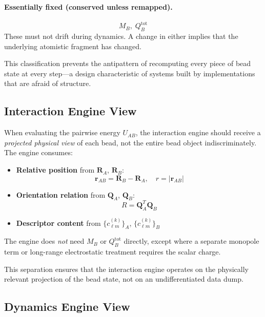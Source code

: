 \documentclass[11pt]{article}
\begin{document}
\paragraph{Essentially fixed (conserved unless remapped).}
\begin{equation}
    M_B,\; Q_B^{\mathrm{tot}}
\end{equation}
These must not drift during dynamics.  A change in either implies that
the underlying atomistic fragment has changed.

This classification prevents the antipattern of recomputing every piece of
bead state at every step---a design characteristic of systems built by
implementations that are afraid of structure.

\subsection{Interaction Engine View}

When evaluating the pairwise energy $U_{AB}$, the interaction engine should
receive a \emph{projected physical view} of each bead, not the entire bead
object indiscriminately.  The engine consumes:
\begin{itemize}
    \item \textbf{Relative position} from $\mathbf{R}_A$, $\mathbf{R}_B$:
          \begin{equation}
              \mathbf{r}_{AB} = \mathbf{R}_B - \mathbf{R}_A, \quad
              r = |\mathbf{r}_{AB}|
          \end{equation}
    \item \textbf{Orientation relation} from $\mathbf{Q}_A$, $\mathbf{Q}_B$:
          \begin{equation}
              R = \mathbf{Q}_A^T \mathbf{Q}_B
          \end{equation}
    \item \textbf{Descriptor content} from $\{c_{\ell m}^{(k)}\}_A$,
          $\{c_{\ell m}^{(k)}\}_B$
\end{itemize}

The engine does \emph{not} need $M_B$ or $Q_B^{\mathrm{tot}}$ directly,
except where a separate monopole term or long-range electrostatic treatment
requires the scalar charge.

This separation ensures that the interaction engine operates on the
physically relevant projection of the bead state, not on an undifferentiated
data dump.

\subsection{Dynamics Engine View}
\end{document}
